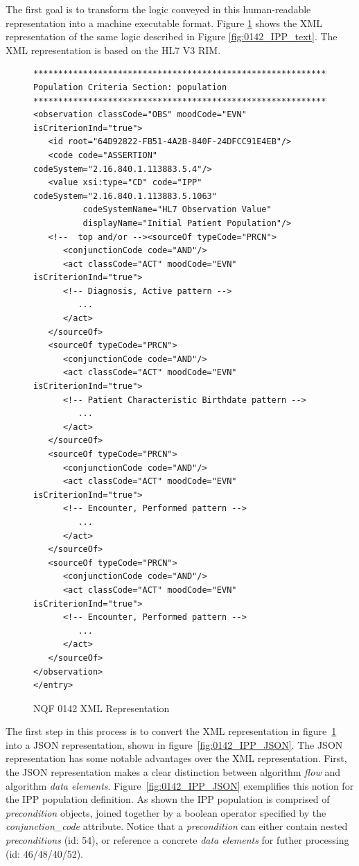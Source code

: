\documentclass{amia}
\begin{document}
The first goal is to transform the logic conveyed in this human-readable representation into a machine executable format. Figure \ref{fig:0142_IPP_XML} shows the XML representation of the same logic described in Figure \ref{fig:0142_IPP_text}. The XML representation is based on the HL7 V3 RIM\cite{..hl7 citation here}.

\begin{figure}[H]
\begin{verbatim}
**************************************************************   
Population Criteria Section: population 
**************************************************************
<observation classCode="OBS" moodCode="EVN" isCriterionInd="true">
   <id root="64D92822-FB51-4A2B-840F-24DFCC91E4EB"/>
   <code code="ASSERTION" codeSystem="2.16.840.1.113883.5.4"/>
   <value xsi:type="CD" code="IPP" codeSystem="2.16.840.1.113883.5.1063"
          codeSystemName="HL7 Observation Value"
          displayName="Initial Patient Population"/>
   <!--  top and/or --><sourceOf typeCode="PRCN">
      <conjunctionCode code="AND"/>
      <act classCode="ACT" moodCode="EVN" isCriterionInd="true">
      <!-- Diagnosis, Active pattern -->
         ...
      </act>
   </sourceOf>
   <sourceOf typeCode="PRCN">
      <conjunctionCode code="AND"/>
      <act classCode="ACT" moodCode="EVN" isCriterionInd="true">
      <!-- Patient Characteristic Birthdate pattern -->
         ...
      </act>
   </sourceOf>
   <sourceOf typeCode="PRCN">
      <conjunctionCode code="AND"/>
      <act classCode="ACT" moodCode="EVN" isCriterionInd="true">
      <!-- Encounter, Performed pattern -->
         ...
      </act>
   </sourceOf>
   <sourceOf typeCode="PRCN">
      <conjunctionCode code="AND"/>
      <act classCode="ACT" moodCode="EVN" isCriterionInd="true">
      <!-- Encounter, Performed pattern -->
         ...
      </act>
   </sourceOf>
</observation>
</entry>
\end{verbatim}    
\caption{NQF 0142 XML Representation} 
\label{fig:0142_IPP_XML}
\end{figure}

The first step in this process is to convert the XML representation in figure~\ref{fig:0142_IPP_XML} into a JSON representation, shown in figure~\ref{fig:0142_IPP_JSON}. The JSON representation has some notable advantages over the XML representation. First, the JSON representation makes a clear distinction between algorithm \textit{flow} and algorithm \textit{data elements}. Figure~\ref{fig:0142_IPP_JSON} exemplifies this notion for the IPP population definition. As shown the IPP population is comprised of \textit{precondition} objects, joined together by a boolean operator specified by the \textit{conjunction\_code} attribute. Notice that a \textit{precondition} can either contain nested \textit{preconditions} (id: 54), or reference a concrete \textit{data elements} for futher processing (id: 46/48/40/52).
\end{document}
